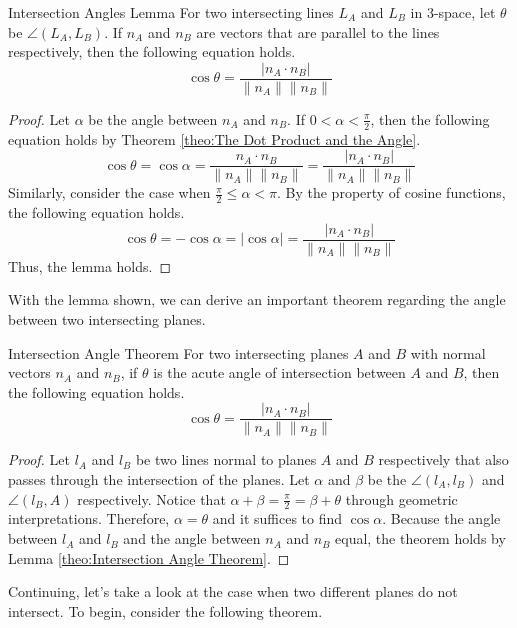 \documentclass[../../main.tex]{subfiles}
\begin{document}
\begin{lemma}{}{Intersection Angles Lemma}
For two intersecting lines $L_A$ and $L_B$ in 3-space, let $\theta$
be $\angle(L_A, L_B)$. If $n_A$ and $n_B$ are vectors that are
parallel to the lines respectively, then the following equation holds.
\[
\cos\theta
= \frac{| n_A \cdot n_B |}{\| n_A \| \| n_B \|}
\]
\end{lemma}
\begin{proof}
Let $\alpha$ be the angle between $n_A$ and $n_B$. If $0 < \alpha <
\frac{\pi}{2}$, then the following equation holds by Theorem
\ref{theo:The Dot Product and the Angle}.
\[
\cos\theta
= \cos\alpha
= \frac{n_A \cdot n_B}{\| n_A \| \| n_B \|}
= \frac{| n_A \cdot n_B |}{\| n_A \| \| n_B \|}
\]
Similarly, consider the case when $\frac{\pi}{2} \leq \alpha < \pi$.
By the property of cosine functions, the following equation holds.
\[
\cos\theta
= -\cos\alpha
= |\cos\alpha|
= \frac{| n_A \cdot n_B |}{\| n_A \| \| n_B \|}
\]
Thus, the lemma holds.
\end{proof}

With the lemma shown, we can derive an important theorem regarding
the angle between two intersecting planes.

\begin{theorem}{}{Intersection Angle Theorem}
For two intersecting planes $A$ and $B$ with normal vectors
$n_A$ and $n_B$, if $\theta$ is the acute angle of intersection
between $A$ and $B$, then the following equation holds.
\[
\cos\theta
= \frac{| n_A \cdot n_B |}{\| n_A \| \| n_B \|}
\]
\end{theorem}
\begin{proof}
Let $l_A$ and $l_B$ be two lines normal to planes $A$ and $B$
respectively that also passes through the intersection of the planes.
Let $\alpha$ and $\beta$ be the $\angle(l_A, l_B)$ and
$\angle(l_B, A)$ respectively. Notice that $\alpha + \beta =
\frac{\pi}{2} = \beta + \theta $ through geometric interpretations.
Therefore, $\alpha = \theta$ and it suffices to find $\cos\alpha$.
Because the angle between $l_A$ and $l_B$ and the angle between
$n_A$ and $n_B$ equal, the theorem holds by Lemma
\ref{theo:Intersection Angle Theorem}.
\end{proof}

Continuing, let's take a look at the case when two different planes
do not intersect. To begin, consider the following theorem.
\end{document}

